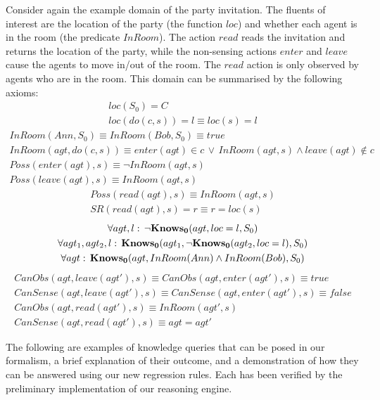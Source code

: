Consider again the example domain of the party invitation. The fluents
of interest are the location of the party (the function $loc$) and
whether each agent is in the room (the predicate $InRoom$). The action
$read$ reads the invitation and returns the location of the party,
while the non-sensing actions $enter$ and $leave$ cause the agents
to move in/out of the room. The $read$ action is only observed by
agents who are in the room. This domain can be summarised by the following
axioms:\begin{gather*}
loc(S_{0})=C\\
loc(do(c,s))=l\equiv loc(s)=l\end{gather*}
 \begin{gather*}
InRoom(Ann,S_{0})\equiv InRoom(Bob,S_{0})\equiv true\\
InRoom(agt,do(c,s))\equiv enter(agt)\in c\,\vee\, InRoom(agt,s)\wedge leave(agt)\notin c\\
Poss(enter(agt),s)\equiv\neg InRoom(agt,s)\\
Poss(leave(agt),s)\equiv InRoom(agt,s)\end{gather*}
 \begin{gather*}
Poss(read(agt),s)\equiv InRoom(agt,s)\\
SR(read(agt),s)=r\equiv r=loc(s)\end{gather*}
 \begin{gather*}
\forall agt,l:\,\neg\mathbf{Knows_{0}}(agt,loc=l,S_{0})\\
\forall agt_{1},agt_{2},l:\,\mathbf{Knows_{0}}(agt_{1},\neg\mathbf{Knows_{0}}(agt_{2},loc=l),S_{0})\\
\forall agt:\,\mathbf{Knows_{0}}(agt,InRoom(Ann)\wedge InRoom(Bob),S_{0})\end{gather*}
 \begin{gather*}
CanObs(agt,leave(agt'),s)\equiv CanObs(agt,enter(agt'),s)\equiv true\\
CanSense(agt,leave(agt'),s)\equiv CanSense(agt,enter(agt'),s)\equiv false\\
CanObs(agt,read(agt'),s)\equiv InRoom(agt',s)\\
CanSense(agt,read(agt'),s)\equiv agt=agt'\end{gather*}


\medskip{}


The following are examples of knowledge queries that can be posed
in our formalism, a brief explanation of their outcome, and a demonstration
of how they can be answered using our new regression rules. Each has
been verified by the preliminary implementation of our reasoning engine.

